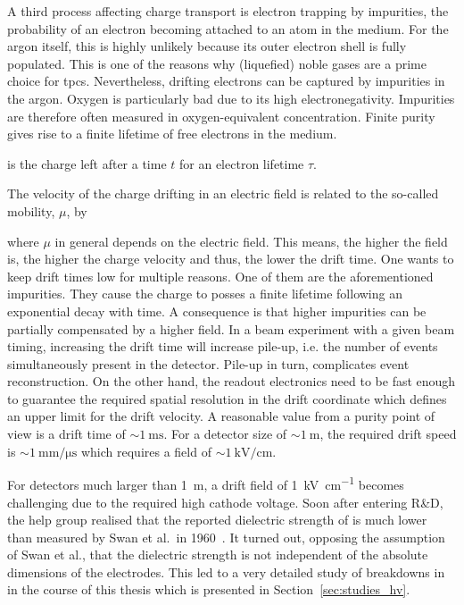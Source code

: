 A third process affecting charge transport is electron trapping by impurities, the probability of an electron becoming attached to an atom in the medium.
For the argon itself, this is highly unlikely because its outer electron shell is fully populated.
This is one of the reasons why (liquefied) noble gases are a prime choice for \glspl{tpc}.
Nevertheless, drifting electrons can be captured by impurities in the argon.
Oxygen is particularly bad due to its high electronegativity.
Impurities are therefore often measured in oxygen-equivalent concentration.
Finite purity gives rise to a finite lifetime of free electrons in the medium.
is the charge left after a time $t$ for an electron lifetime $\tau$.

The velocity of the charge drifting in an electric field is related to the so-called mobility, $\mu$, by
where $\mu$ in general depends on the electric field.
This means, the higher the field is, the higher the charge velocity and thus, the lower the drift time.
One wants to keep drift times low for multiple reasons.
One of them are the aforementioned impurities.
They cause the charge to posses a finite lifetime following an exponential decay with time.
A consequence is that higher impurities can be partially compensated by a higher field.
In a beam experiment with a given beam timing, increasing the drift time will increase pile-up, i.e. the number of events simultaneously present in the detector.
Pile-up in turn, complicates event reconstruction.
On the other hand, the readout electronics need to be fast enough to guarantee the required spatial resolution in the drift coordinate which defines an upper limit for the drift velocity.
A reasonable value from a purity point of view is a drift time of $\sim{\SI{1}{\milli\second}}$.
For a detector size of $\sim{\SI{1}{\metre}}$, the required drift speed is $\sim{\SI{1}{\milli\metre\per\micro\second}}$ which requires a field of $\sim{\SI{1}{\kilo\volt\per\centi\metre}}$.

For detectors much larger than \SI{1}{\metre}, a drift field of \SI{1}{\kilo\volt\per\centi\metre} becomes challenging due to the required high cathode voltage.
Soon after entering \lartpc{} R\&D, the \gls{help} group realised that the reported dielectric strength of \lar{} is much lower~\cite{breakdown_14} than measured by Swan et al.\ in 1960~\cite{swan1, swan2}.
It turned out, opposing the assumption of Swan et al., that the dielectric strength is not independent of the absolute dimensions of the electrodes.
This led to a very detailed study of breakdowns in \lar{} in the course of this thesis which is presented in Section~\ref{sec:studies_hv}.

